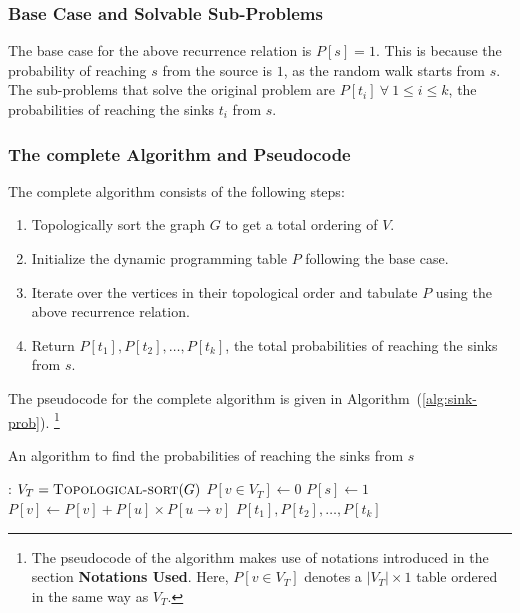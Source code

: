 \documentclass[12pt]{report}
\begin{document}
    \subsubsection*{Base Case and Solvable Sub-Problems}
    The base case for the above recurrence relation is $P[s] = 1$.
    This is because the probability of reaching $s$ from the source is $1$, as the random walk starts from $s$.
    \vspace*{10pt} \\
    The sub-problems that solve the original problem are $P[t_{i}] \ \forall \ 1 \leq i \leq k$, the probabilities of reaching the sinks $t_{i}$ from $s$.

    \subsubsection*{The complete Algorithm and Pseudocode}
    The complete algorithm consists of the following steps:
    \begin{enumerate}
        \item Topologically sort the graph $G$ to get a total ordering of $V$.
        \item Initialize the dynamic programming table $P$ following the base case.
        \item Iterate over the vertices in their topological order and tabulate $P$ using the above recurrence relation.
        \item Return $P[t_{1}], P[t_{2}], \dots, P[t_{k}]$, the total probabilities of reaching the sinks from $s$.
    \end{enumerate}
    The pseudocode for the complete algorithm is given in Algorithm~(\ref{alg:sink-prob}).
    \footnote{
        The pseudocode of the algorithm makes use of notations introduced in the section \textbf{Notations Used}.
        Here, $P[v \in V_{T}]$ denotes a $|V_{T}| \times 1$ table ordered in the same way as $V_{T}$.
    }

    \begin{algorithm}
        \caption{An algorithm to find the probabilities of reaching the sinks from $s$}
        \label{alg:sink-prob}
        \begin{algorithmic}[1]
            :
                \State $V_{T} = \Call{Topological-sort}{G}$
                \State $P[v \in V_{T}] \gets 0$
                \State $P[s] \gets 1$
                        \State $P[v] \gets P[v] + P[u] \times P[u \to v]$
                    \EndFor
                \EndFor
                \State \Return $P[t_{1}], P[t_{2}], \dots, P[t_{k}]$
            \EndProcedure
        \end{algorithmic}
    \end{algorithm}
\end{document}
